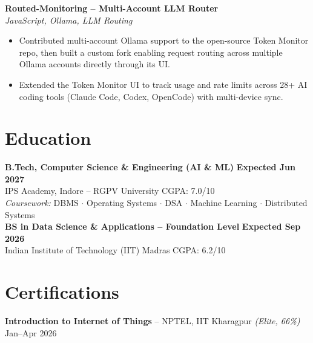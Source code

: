 \documentclass[letterpaper,11pt]{article}
\begin{document}
\vspace{1pt}
\textbf{Routed-Monitoring -- Multi-Account LLM Router} \\
\hspace*{0.15in}\textit{JavaScript, Ollama, LLM Routing}
\begin{itemize}[leftmargin=0.32in,labelsep=0.45em,itemsep=1pt,topsep=2pt,partopsep=0pt,parsep=0pt]
  \item Contributed multi-account Ollama support to the open-source Token Monitor repo, then built
        a custom fork enabling request routing across multiple Ollama accounts directly through
        its UI.
  \item Extended the Token Monitor UI to track usage and rate limits across 28+ AI coding tools
        (Claude Code, Codex, OpenCode) with multi-device sync.
\end{itemize}

\section{Education}
\textbf{B.Tech, Computer Science \& Engineering (AI \& ML)} \hfill \textbf{Expected Jun 2027} \\
IPS Academy, Indore -- RGPV University \hfill CGPA: 7.0/10 \\
\textit{Coursework:} DBMS $\cdot$ Operating Systems $\cdot$ DSA $\cdot$ Machine Learning $\cdot$ Distributed Systems \\[3pt]
\textbf{BS in Data Science \& Applications -- Foundation Level} \hfill \textbf{Expected Sep 2026} \\
Indian Institute of Technology (IIT) Madras \hfill CGPA: 6.2/10

\section{Certifications}
\textbf{Introduction to Internet of Things} -- NPTEL, IIT Kharagpur \textit{(Elite, 66\%)} \hfill Jan--Apr 2026
\end{document}
